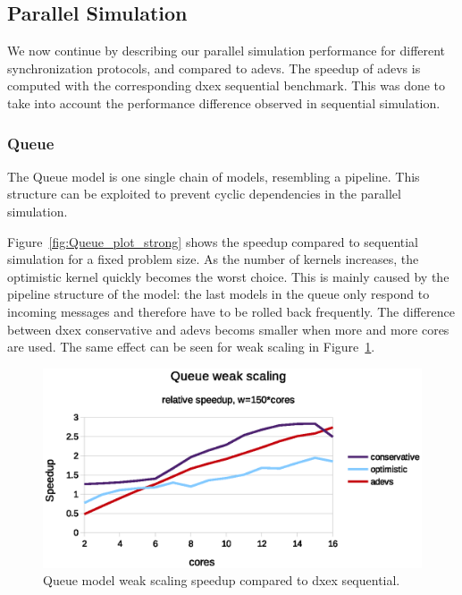 \subsection{Parallel Simulation}
We now continue by describing our parallel simulation performance for different synchronization protocols, and compared to adevs.
The speedup of adevs is computed with the corresponding dxex sequential benchmark.
This was done to take into account the performance difference observed in sequential simulation.

\subsubsection{Queue}
The Queue model is one single chain of models, resembling a pipeline.
This structure can be exploited to prevent cyclic dependencies in the parallel simulation.

Figure~\ref{fig:Queue_plot_strong} shows the speedup compared to sequential simulation for a fixed problem size.
As the number of kernels increases, the optimistic kernel quickly becomes the worst choice.
This is mainly caused by the pipeline structure of the model: the last models in the queue only respond to incoming messages and therefore have to be rolled back frequently.
The difference between dxex conservative and adevs becoms smaller when more and more cores are used.
The same effect can be seen for weak scaling in Figure~\ref{fig:Queue_plot_weak}.

\begin{figure}
	\center
	\includegraphics[width=\columnwidth]{fig/queue_fixed_weak_speedup.eps}
	\caption{Queue model weak scaling speedup compared to dxex sequential.}
	\label{fig:Queue_plot_weak}
\end{figure}
	
